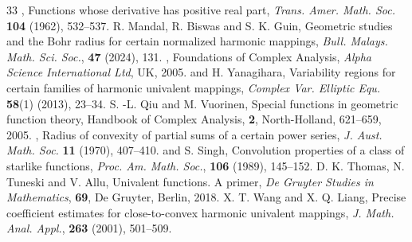 \documentclass[11pt,reqno]{amsart}
\newtheorem{open problem}{Open problem}[section]
\numberwithin{equation}{section}
\begin{document}
\begin{thebibliography}{33}
, Functions whose derivative has positive real part, {\it Trans. Amer. Math. Soc.} {\bf104} (1962), 532--537.
 {\sc R. Mandal, R. Biswas} and {\sc S. K. Guin}, Geometric studies and the Bohr radius for certain normalized harmonic mappings, {\it Bull. Malays. Math. Sci. Soc.}, {\bf47} (2024), 131.
, Foundations of Complex Analysis, {\it Alpha Science International Ltd}, UK, 2005.
 and {\sc H. Yanagihara}, Variability regions for certain families of harmonic univalent mappings, {\it Complex Var. Elliptic Equ.} {\bf58}(1) (2013), 23--34. 
 {\sc S. -L. Qiu} and {\sc M. Vuorinen}, Special functions in geometric function theory, Handbook of Complex Analysis, {\bf2}, North-Holland, 621--659, 2005.
, Radius of convexity of partial sums of a certain power series, {\it J. Aust. Math. Soc.} {\bf11} (1970), 407--410.
 and {\sc S. Singh}, Convolution properties of a class of starlike functions, {\it Proc. Am. Math. Soc.}, {\bf106} (1989), 145--152.
 {\sc D. K. Thomas, N. Tuneski} and {\sc V. Allu}, Univalent functions. A primer, {\it De Gruyter Studies in Mathematics}, {\bf69}, De Gruyter, Berlin, 2018.
 {\sc X. T. Wang} and {\sc X. Q. Liang}, Precise coefficient estimates for close-to-convex harmonic univalent mappings, {\it J. Math. Anal. Appl.}, {\bf263} (2001), 501--509.
\end{thebibliography}
\end{document}
